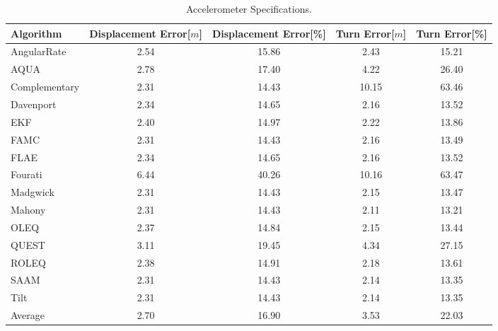 \begin{table}[H]
    \begin{center}
        \begin{tabular}[t]{lcccc}
            \hline
            Algorithm   & Displacement Error[$m$] & Displacement Error[\%] & Turn Error[$m$] & Turn Error[\%] \\
            \hline
            AngularRate & 2.54                    & 15.86                  & 2.43            & 15.21          \\            AQUA            & 2.78  & 17.40 & 4.22 & 26.40              \\            Complementary            & 2.31  & 14.43 & 10.15 & 63.46              \\            Davenport            & 2.34  & 14.65 & 2.16 & 13.52              \\            EKF            & 2.40  & 14.97 & 2.22 & 13.86              \\            FAMC            & 2.31  & 14.43 & 2.16 & 13.49              \\            FLAE            & 2.34  & 14.65 & 2.16 & 13.52              \\            Fourati            & 6.44  & 40.26 & 10.16 & 63.47              \\            Madgwick            & 2.31  & 14.43 & 2.15 & 13.47              \\            Mahony            & 2.31  & 14.43 & 2.11 & 13.21              \\            OLEQ            & 2.37  & 14.84 & 2.15 & 13.44              \\            QUEST            & 3.11  & 19.45 & 4.34 & 27.15              \\            ROLEQ            & 2.38  & 14.91 & 2.18 & 13.61              \\            SAAM            & 2.31  & 14.43 & 2.14 & 13.35              \\            Tilt            & 2.31  & 14.43 & 2.14 & 13.35              \\
            \hline
            Average     & 2.70                    & 16.90                  & 3.53            & 22.03
        \end{tabular}
        \caption{Accelerometer Specifications. }
        \label{tab:accelerometer_specification}
    \end{center}
\end{table}